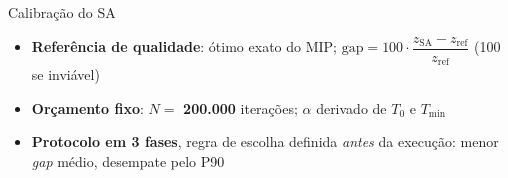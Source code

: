\documentclass[aspectratio=169,11pt]{beamer}
\begin{document}
\begin{frame}{Calibração do SA}
\begin{itemize}
    \small
    \item \textbf{Referência de qualidade}: ótimo exato do MIP; \quad
    $\text{gap} = 100 \cdot \dfrac{z_{\text{SA}} - z_{\text{ref}}}{z_{\text{ref}}}$ (100 se inviável)
    \item \textbf{Orçamento fixo}: $N =$ \textbf{200.000} iterações; $\alpha$ derivado de $T_0$ e $T_{\min}$
    \item \textbf{Protocolo em 3 fases}, regra de escolha definida \emph{antes} da execução: menor \textit{gap} médio, desempate pelo P90
\end{itemize}


\end{frame}
\end{document}

